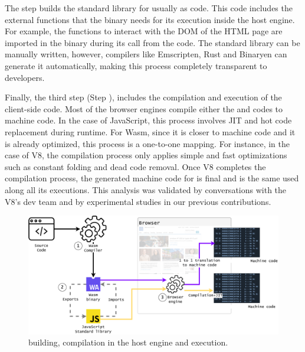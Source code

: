 The step  builds the standard library for usually as  code. This code includes the external functions that the binary needs for its execution inside the host engine. For example, the functions to interact with the DOM of the HTML page are imported in the binary during its call from the code. The standard library can be manually written, however, compilers like Emscripten, Rust and Binaryen can generate it automatically, making this process completely transparent to developers.

Finally, the third step (Step ), includes the compilation and execution of the client-side code. Most of the browser engines compile either the and codes to machine code. In the case of JavaScript, this process involves JIT and hot code replacement during runtime. For Wasm, since it is closer to machine code and it is already optimized, this process is a one-to-one mapping. For instance, in the case of V8, the compilation process only applies simple and fast optimizations such as constant folding and dead code removal. Once V8 completes the compilation process, the generated machine code for is final and is the same used along all its executions. This analysis was validated by conversations with the V8's dev team and by experimental studies in our previous contributions.  

\begin{figure}[h]
    \centering
    \includegraphics[width=\linewidth]{diagrams/wasm_workflow.pdf}
    \caption{building, compilation in the host engine and execution. }
    \label{diagrams:sota:wasm}
\end{figure}

